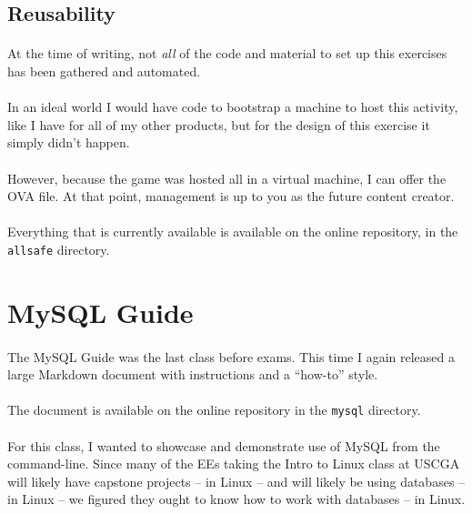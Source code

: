\documentclass[11pt]{article}
\begin{document}
	\subsection{Reusability}

	\paragraph{} At the time of writing, not \textit{all} of the code and material to set up this exercises has been gathered and automated. 

	\paragraph{} In an ideal world I would have code to bootstrap a machine to host this activity, like I have for all of my other products, but for the design of this exercise it simply didn't happen.

	\paragraph{} However, because the game was hosted all in a virtual machine, I can offer the OVA file. At that point, management is up to you as the future content creator.	

	\paragraph{} Everything that is currently available is available on the online repository, in the \texttt{allsafe} directory.


	\newpage
	\section{MySQL Guide}
	
	\paragraph{} The MySQL Guide was the last class before exams. This time I again released a large Markdown document with instructions and a ``how-to'' style.

	\paragraph{} The document is available on the online repository in the \texttt{mysql} directory. 

	\paragraph{} For this class, I wanted to showcase and demonstrate use of MySQL from the command-line. Since many of the EEs taking the Intro to Linux class at USCGA will likely have capstone projects -- in Linux -- and will likely be using databases -- in Linux -- we figured they ought to know how to work with databases -- in Linux.
\end{document}
